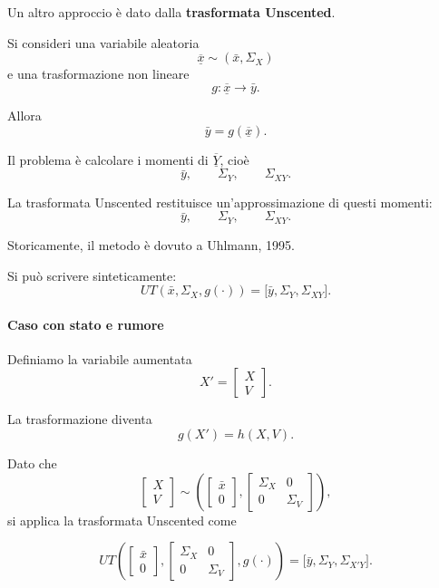 \documentclass[11pt,a4paper]{article}
\begin{document}
Un altro approccio è dato dalla \textbf{trasformata Unscented}.

Si consideri una variabile aleatoria
\[
\overline{\underline{x}} \sim (\bar x,\Sigma_X)
\]
e una trasformazione non lineare
\[
g:\overline{\underline{x}}\longrightarrow \bar y.
\]

Allora
\[
\bar y = g(\overline{\underline{x}}).
\]

Il problema è calcolare i momenti di \(\overline{\underline{Y}}\), cioè
\[
\bar y,\qquad \Sigma_Y,\qquad \Sigma_{XY}.
\]

La trasformata Unscented restituisce un'approssimazione di questi momenti:
\[
\bar y,\qquad \Sigma_Y,\qquad \Sigma_{XY}.
\]

Storicamente, il metodo è dovuto a Uhlmann, 1995.

Si può scrivere sinteticamente:
\[
UT(\bar x,\Sigma_X,g(\cdot))
=
\bigl[\bar y,\Sigma_Y,\Sigma_{XY}\bigr].
\]

\paragraph{Caso con stato e rumore}

Definiamo la variabile aumentata
\[
X'
=
\begin{bmatrix}
X\\
V
\end{bmatrix}.
\]

La trasformazione diventa
\[
g(X')=h(X,V).
\]

Dato che
\[
\begin{bmatrix}
X\\
V
\end{bmatrix}
\sim
\left(
\begin{bmatrix}
\bar x\\
0
\end{bmatrix},
\begin{bmatrix}
\Sigma_X & 0\\
0 & \Sigma_V
\end{bmatrix}
\right),
\]
si applica la trasformata Unscented come

\[
UT\!\left(
\begin{bmatrix}
\bar x\\
0
\end{bmatrix},
\begin{bmatrix}
\Sigma_X & 0\\
0 & \Sigma_V
\end{bmatrix},
g(\cdot)
\right)
=
\bigl[
\bar y,\Sigma_Y,\Sigma_{X'Y}
\bigr].
\]
\end{document}
